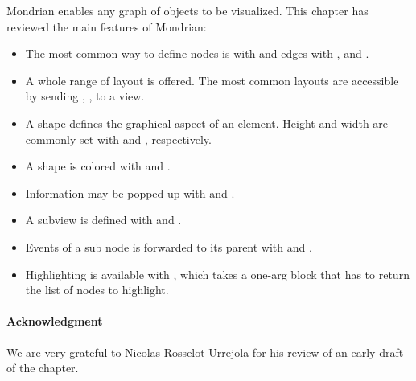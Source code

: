 \documentclass[a4paper,10pt,twoside]{book}
\begin{document}
Mondrian enables any graph of objects to be visualized. This chapter has reviewed the main features of Mondrian:
\begin{itemize}
\item The most common way to define nodes is with  and edges with ,  and .
\item A whole range of layout is offered. The most common layouts are accessible by sending , ,  to a view.
\item A shape defines the graphical aspect of an element. Height and width are commonly set with  and , respectively. 
\item A shape is colored with  and .
\item Information may be popped up with  and .
\item A subview is defined with  and .
\item Events of a sub node is forwarded to its parent with  and .
\item Highlighting is available with , which takes a one-arg block that has to return the list of nodes to highlight.
\end{itemize}

\paragraph{Acknowledgment}
We are very grateful to Nicolas Rosselot Urrejola for his review of an early draft of the chapter.

%
%


\ifx\wholebook\relax\else
   
   
\end{document}
